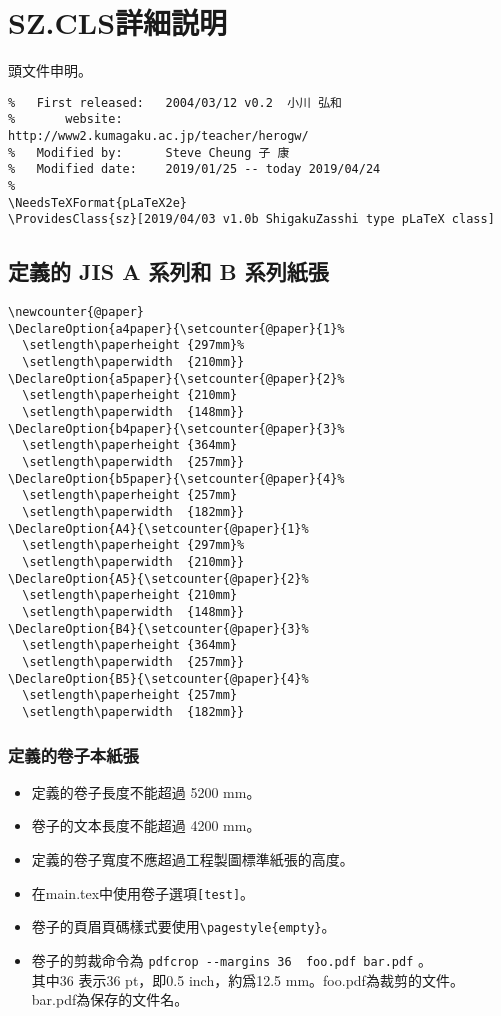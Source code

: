 \section{SZ.CLS詳細説明}
\par 頭文件申明。
\begin{lstlisting}[firstnumber=1]
%   File:             ShigakuZasshi type pLaTeX class
%   First released:   2004/03/12 v0.2  小川 弘和
%		website:					http://www2.kumagaku.ac.jp/teacher/herogw/
%   Modified by:      Steve Cheung 子 康
%   Modified date:    2019/01/25 -- today 2019/04/24
%
\NeedsTeXFormat{pLaTeX2e}
\ProvidesClass{sz}[2019/04/03 v1.0b ShigakuZasshi type pLaTeX class]
\end{lstlisting}

\subsection{定義的 JIS A 系列和 B 系列紙張}
\begin{lstlisting}[firstnumber=11]
\newcounter{@paper}
\DeclareOption{a4paper}{\setcounter{@paper}{1}%
  \setlength\paperheight {297mm}%
  \setlength\paperwidth  {210mm}}
\DeclareOption{a5paper}{\setcounter{@paper}{2}%
  \setlength\paperheight {210mm}
  \setlength\paperwidth  {148mm}}
\DeclareOption{b4paper}{\setcounter{@paper}{3}%
  \setlength\paperheight {364mm}
  \setlength\paperwidth  {257mm}}
\DeclareOption{b5paper}{\setcounter{@paper}{4}%
  \setlength\paperheight {257mm}
  \setlength\paperwidth  {182mm}}
\DeclareOption{A4}{\setcounter{@paper}{1}%
  \setlength\paperheight {297mm}%
  \setlength\paperwidth  {210mm}}
\DeclareOption{A5}{\setcounter{@paper}{2}%
  \setlength\paperheight {210mm}
  \setlength\paperwidth  {148mm}}
\DeclareOption{B4}{\setcounter{@paper}{3}%
  \setlength\paperheight {364mm}
  \setlength\paperwidth  {257mm}}
\DeclareOption{B5}{\setcounter{@paper}{4}%
  \setlength\paperheight {257mm}
  \setlength\paperwidth  {182mm}}
\end{lstlisting}

\subsubsection{定義的卷子本紙張}
\par{}
\begin{itemize}
\item 定義的卷子長度不能超過 5200 mm。
\item 卷子的文本長度不能超過 4200 mm。
\item 定義的卷子寬度不應超過工程製圖標準紙張的高度。
\item	在main.tex中使用卷子選項\verb+[test]+。
\item 卷子的頁眉頁碼樣式要使用\verb+\pagestyle{empty}+。
\item 卷子的剪裁命令為 {\color{red}\verb+pdfcrop --margins 36  foo.pdf bar.pdf+} 。\\
其中36 表示36 pt，即0.5 inch，約爲12.5 mm。foo.pdf為裁剪的文件。
bar.pdf為保存的文件名。
\end{itemize}

